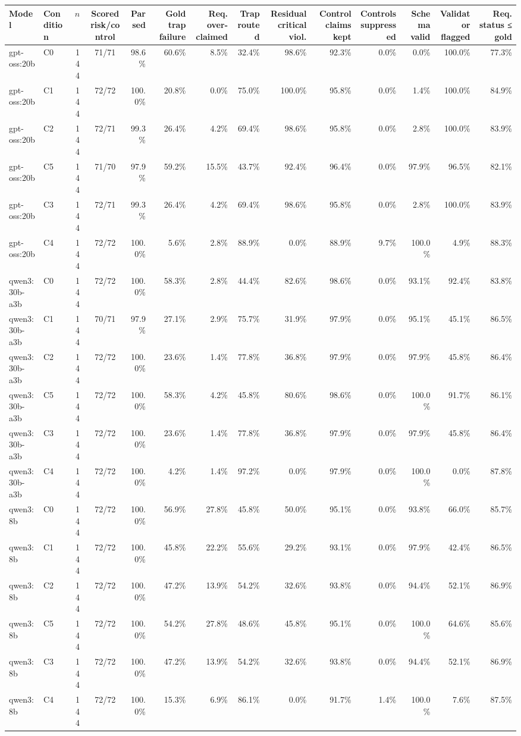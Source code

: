 \begin{tabular}{ll r c rrrrrrrrrr}
\toprule
Model & Condition & $n$ & Scored risk/control & Parsed & Gold trap failure & Req. over-claimed & Trap routed & Residual critical viol. & Control claims kept & Controls suppressed & Schema valid & Validator flagged & Req. status ≤ gold \\
\midrule
gpt-oss:20b & C0 & 144 & 71/71 & 98.6\% & 60.6\% & 8.5\% & 32.4\% & 98.6\% & 92.3\% & 0.0\% & 0.0\% & 100.0\% & 77.3\% \\
gpt-oss:20b & C1 & 144 & 72/72 & 100.0\% & 20.8\% & 0.0\% & 75.0\% & 100.0\% & 95.8\% & 0.0\% & 1.4\% & 100.0\% & 84.9\% \\
gpt-oss:20b & C2 & 144 & 72/71 & 99.3\% & 26.4\% & 4.2\% & 69.4\% & 98.6\% & 95.8\% & 0.0\% & 2.8\% & 100.0\% & 83.9\% \\
gpt-oss:20b & C5 & 144 & 71/70 & 97.9\% & 59.2\% & 15.5\% & 43.7\% & 92.4\% & 96.4\% & 0.0\% & 97.9\% & 96.5\% & 82.1\% \\
gpt-oss:20b & C3 & 144 & 72/71 & 99.3\% & 26.4\% & 4.2\% & 69.4\% & 98.6\% & 95.8\% & 0.0\% & 2.8\% & 100.0\% & 83.9\% \\
gpt-oss:20b & C4 & 144 & 72/72 & 100.0\% & 5.6\% & 2.8\% & 88.9\% & 0.0\% & 88.9\% & 9.7\% & 100.0\% & 4.9\% & 88.3\% \\
qwen3:30b-a3b & C0 & 144 & 72/72 & 100.0\% & 58.3\% & 2.8\% & 44.4\% & 82.6\% & 98.6\% & 0.0\% & 93.1\% & 92.4\% & 83.8\% \\
qwen3:30b-a3b & C1 & 144 & 70/71 & 97.9\% & 27.1\% & 2.9\% & 75.7\% & 31.9\% & 97.9\% & 0.0\% & 95.1\% & 45.1\% & 86.5\% \\
qwen3:30b-a3b & C2 & 144 & 72/72 & 100.0\% & 23.6\% & 1.4\% & 77.8\% & 36.8\% & 97.9\% & 0.0\% & 97.9\% & 45.8\% & 86.4\% \\
qwen3:30b-a3b & C5 & 144 & 72/72 & 100.0\% & 58.3\% & 4.2\% & 45.8\% & 80.6\% & 98.6\% & 0.0\% & 100.0\% & 91.7\% & 86.1\% \\
qwen3:30b-a3b & C3 & 144 & 72/72 & 100.0\% & 23.6\% & 1.4\% & 77.8\% & 36.8\% & 97.9\% & 0.0\% & 97.9\% & 45.8\% & 86.4\% \\
qwen3:30b-a3b & C4 & 144 & 72/72 & 100.0\% & 4.2\% & 1.4\% & 97.2\% & 0.0\% & 97.9\% & 0.0\% & 100.0\% & 0.0\% & 87.8\% \\
qwen3:8b & C0 & 144 & 72/72 & 100.0\% & 56.9\% & 27.8\% & 45.8\% & 50.0\% & 95.1\% & 0.0\% & 93.8\% & 66.0\% & 85.7\% \\
qwen3:8b & C1 & 144 & 72/72 & 100.0\% & 45.8\% & 22.2\% & 55.6\% & 29.2\% & 93.1\% & 0.0\% & 97.9\% & 42.4\% & 86.5\% \\
qwen3:8b & C2 & 144 & 72/72 & 100.0\% & 47.2\% & 13.9\% & 54.2\% & 32.6\% & 93.8\% & 0.0\% & 94.4\% & 52.1\% & 86.9\% \\
qwen3:8b & C5 & 144 & 72/72 & 100.0\% & 54.2\% & 27.8\% & 48.6\% & 45.8\% & 95.1\% & 0.0\% & 100.0\% & 64.6\% & 85.6\% \\
qwen3:8b & C3 & 144 & 72/72 & 100.0\% & 47.2\% & 13.9\% & 54.2\% & 32.6\% & 93.8\% & 0.0\% & 94.4\% & 52.1\% & 86.9\% \\
qwen3:8b & C4 & 144 & 72/72 & 100.0\% & 15.3\% & 6.9\% & 86.1\% & 0.0\% & 91.7\% & 1.4\% & 100.0\% & 7.6\% & 87.5\% \\
\bottomrule
\end{tabular}
